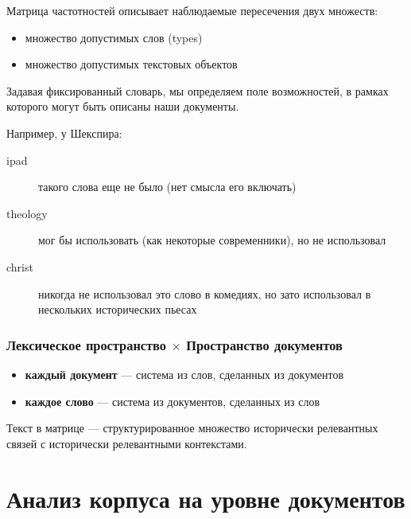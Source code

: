 \documentclass[svgnames]{beamer}
\begin{document}
\begin{frame}[standout]
   Матрица частотностей описывает наблюдаемые пересечения двух
   множеств:
   \begin{itemize}
   \item множество допустимых слов (types)
   \item множество допустимых текстовых объектов
   \end{itemize}
\end{frame}

\begin{frame}
  Задавая фиксированный словарь, мы определяем \alert{поле
    возможностей}, в рамках которого могут быть описаны наши
  документы.

  Например, у Шекспира:

  \begin{description}
  \item[ipad] такого слова еще не было (нет смысла его включать)
  \item[theology] мог бы использовать (как некоторые современники), но
    не использовал
  \item[christ] никогда не использовал это слово в комедиях, но зато
    использовал в нескольких исторических пьесах
  \end{description}
\end{frame}

\begin{frame}
  \frametitle{Лексическое пространство $\times$ Пространство документов}
  \begin{itemize}
  \item \textbf{каждый документ} — система из слов, сделанных из
    документов
  \item \textbf{каждое слово} — система из документов, сделанных из
    слов
  \end{itemize}
  \pause
  \begin{block}{Текст в матрице —}
    структурированное множество исторически релевантных связей с
    исторически релевантными контекстами.
  \end{block}
\end{frame}

\section{Анализ корпуса на уровне документов}
\end{document}
